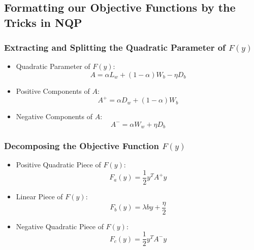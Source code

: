 \documentclass{beamer}
\begin{document}
\subsection{Formatting our Objective Functions by the Tricks in NQP}
\begin{frame}\frametitle{Extracting and Splitting the Quadratic Parameter of $F(y)$}
\begin{itemize}
\item Quadratic Parameter of $F(y)$:
\begin{equation}\label{eq27}
A=\alpha L_w+(1-\alpha)W_b-\eta D_b
\end{equation}
\item Positive Components of $A$:
\begin{equation}\label{eq28}
A^+=\alpha D_w+(1-\alpha)W_b
\end{equation}
\item Negative Components of $A$:
\begin{equation}\label{eq29}
A^-=\alpha W_w+\eta D_b
\end{equation}
\end{itemize}
\end{frame}


\begin{frame}\frametitle{Decomposing the Objective Function $F(y)$}
\begin{itemize}
\item Positive Quadratic Piece of $F(y)$:
\begin{equation}\label{eq30}
F_a(y)=\frac{1}{2}y^TA^+y
\end{equation}
\item Linear Piece of $F(y)$:
\begin{equation}\label{eq31}
F_b(y)=\lambda by+\frac{\eta}{2}
\end{equation}
\item Negative Quadratic Piece of $F(y)$:
\begin{equation}\label{eq32}
F_c(y)=\frac{1}{2}y^TA^-y
\end{equation}
\end{itemize}
\end{frame}
\end{document}
